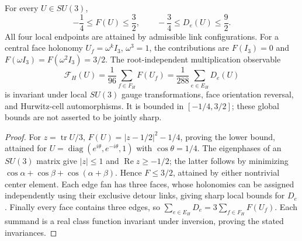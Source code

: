 \documentclass[12pt,a4paper]{article}
\begin{document}
\begin{theorem}
\label{p10:thm:v2220-sharp-flux-bounds}
For every $U\in SU(3)$,
\begin{equation}
\label{p10:eq:v2220-local-bounds}
 -\frac14\le F(U)\le\frac32,\qquad
 -\frac34\le D_e(U)\le\frac92.
\end{equation}
All four local endpoints are attained by admissible link
configurations.  For a central face holonomy $U_f=\omega^kI_3$,
$\omega^3=1$, the contributions are $F(I_3)=0$ and
$F(\omega I_3)=F(\omega^2I_3)=3/2$.
The root-independent multiplication observable
\begin{equation}
\label{p10:eq:v2220-global-observable}
 \mathcal F_H(U)=\frac1{96}\sum_{f\in F_H}F(U_f)
 =\frac1{288}\sum_{e\in E_H}D_e(U)
\end{equation}
is invariant under local $SU(3)$ gauge transformations, face
orientation reversal, and Hurwitz-cell automorphisms.  It is bounded in
$[-1/4,3/2]$; these global bounds are not asserted to be jointly sharp.
\end{theorem}
\begin{proof}
For $z=\operatorname{tr}U/3$,
$F(U)=|z-1/2|^2-1/4$, proving the lower bound, attained for
$U=\operatorname{diag}(e^{i\theta},e^{-i\theta},1)$ with
$\cos\theta=1/4$.  The eigenphases of an $SU(3)$ matrix give
$|z|\le1$ and $\operatorname{Re}z\ge-1/2$; the latter follows by
minimizing $\cos\alpha+\cos\beta+\cos(\alpha+\beta)$.  Hence
$F\le3/2$, attained by either nontrivial center element.
Each edge fan has three faces, whose holonomies can be assigned
independently using their exclusive detour links, giving sharp local
bounds for $D_e$.  Finally every face contains three edges, so
$\sum_{e\in E_H}D_e=3\sum_{f\in F_H}F(U_f)$.  Each summand is a real
class function invariant under inversion, proving the stated invariances.
\end{proof}
\end{document}
